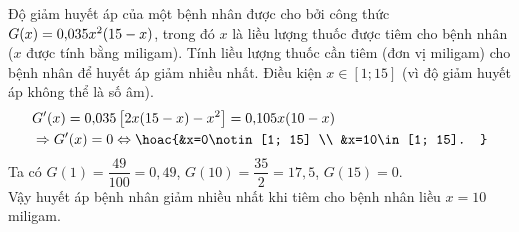 \begin{ex}%
	Độ giảm huyết áp của một bệnh nhân được cho bởi công thức $\break G(x)=0{,}035 x^2(15-x)$, trong đó $x$ là liều lượng thuốc được tiêm cho bệnh nhân ($x$ được tính bằng miligam). Tính liều lượng thuốc cần tiêm (đơn vị miligam) cho bệnh nhân để huyết áp giảm nhiều nhất.
	\loigiai
	{Điều kiện $x \in[1 ; 15]$ (vì độ giảm huyết áp không thể là số âm).
		$$\begin{aligned}
			& G'(x)=0{,}035\left[2 x(15-x)-x^2\right]=0{,}105 x(10-x) \\
			& \Rightarrow G'(x)=0 \Leftrightarrow\hoac{&x=0\notin[1; 15] \\
				&x=10\in[1; 15].
		}\end{aligned}$$
		Ta có $G(1)=\dfrac{49}{100}=0{,}49$, $G(10)=\dfrac{35}{2}=17{,}5$, $G(15)=0$.\\
		Vậy huyết áp bệnh nhân giảm nhiều nhất khi tiêm cho bệnh nhân liều $x=10$ miligam.
	}
\end{ex}

